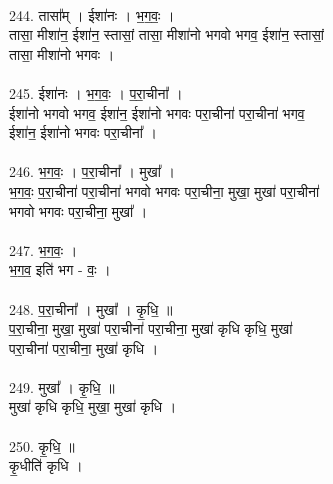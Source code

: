 \\
244. तासा᳚म् । ईशा॑नः । भ॒ग॒वः॒ ।\\
तासा॒ मीशा॑न॒ ईशा॑न॒ स्तासां॒ तासा॒ मीशा॑नो भगवो भगव॒ ईशा॑न॒ स्तासां॒\\
तासा॒ मीशा॑नो भगवः ।\\
\\
245. ईशा॑नः । भ॒ग॒वः॒ । प॒रा॒चीना᳚ ।\\
ईशा॑नो भगवो भगव॒ ईशा॑न॒ ईशा॑नो भगवः परा॒चीना॑ परा॒चीना॑ भगव॒\\
ईशा॑न॒ ईशा॑नो भगवः परा॒चीना᳚ ।\\
\\
246. भ॒ग॒वः॒ । प॒रा॒चीना᳚ । मुखा᳚ ।\\
भ॒ग॒वः॒ प॒रा॒चीना॑ परा॒चीना॑ भगवो भगवः परा॒चीना॒ मुखा॒ मुखा॑ परा॒चीना॑\\
भगवो भगवः परा॒चीना॒ मुखा᳚ ।\\
\\
247. भ॒ग॒वः॒ ।\\
भ॒ग॒व॒ इति॑ भग - वः॒ ।\\
\\
248. प॒रा॒चीना᳚ । मुखा᳚ । कृ॒धि॒ ॥\\
प॒रा॒चीना॒ मुखा॒ मुखा॑ परा॒चीना॑ परा॒चीना॒ मुखा॑ कृधि कृधि॒ मुखा॑\\
परा॒चीना॑ परा॒चीना॒ मुखा॑ कृधि ।\\
\\
249. मुखा᳚ । कृ॒धि॒ ॥\\
मुखा॑ कृधि कृधि॒ मुखा॒ मुखा॑ कृधि ।\\
\\
250. कृ॒धि॒ ॥\\
कृ॒धीति॑ कृधि ।\\
